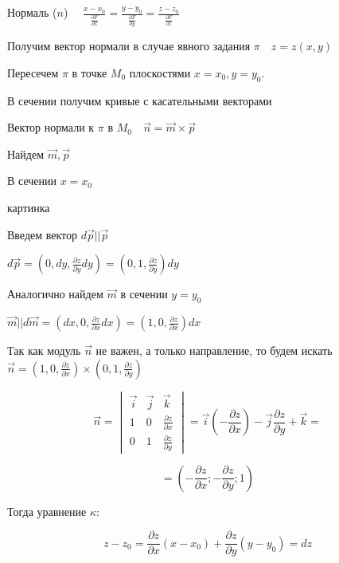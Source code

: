 \documentclass[12pt]{article}
\begin{document}
    Нормаль ($n$) $\quad \frac{x - x_0}{\frac{\partial F}{\partial x}} = \frac{y - y_0}{\frac{\partial F}{\partial y}} = \frac{z - z_0}{\frac{\partial F}{\partial z}}$

    \Nota Получим вектор нормали в случае явного задания $\pi \quad z = z(x, y)$

    Пересечем $\pi$ в точке $M_0$ плоскостями $x = x_0, y = y_0$.

    В сечении получим кривые с касательными векторами

    Вектор нормали к $\pi$ в $M_0 \quad \overrightarrow{n} = \overrightarrow{m} \times \overrightarrow{p}$

    Найдем $\overrightarrow{m}, \overrightarrow{p}$

    В сечении $x = x_0$

    картинка

    Введем вектор $d\overrightarrow{p} || \overrightarrow{p}$

    $d\overrightarrow{p} = \left(0, dy, \frac{\partial z}{\partial y}dy\right) = \left(0, 1, \frac{\partial z}{\partial y}\right) dy$

    Аналогично найдем $\overrightarrow{m}$ в сечении $y = y_0$

    $\overrightarrow{m} || d\overrightarrow{m} = \left(dx, 0, \frac{\partial z}{\partial x}dx\right) = \left(1, 0, \frac{\partial z}{\partial x}\right) dx$

    Так как модуль $\overrightarrow{n}$ не важен, а только направление, то будем искать
    $\overrightarrow{n} = \left(1, 0, \frac{\partial z}{\partial x}\right) \times \left(0, 1, \frac{\partial z}{\partial y}\right)$

    \[\overrightarrow{n} =
    \begin{vmatrix} \overrightarrow{i} & \overrightarrow{j} & \overrightarrow{k} \\
        1 & 0 & \frac{\partial z}{\partial x} \\ 0 & 1 & \frac{\partial z}{\partial y}
    \end{vmatrix} = \overrightarrow{i} \left(-\frac{\partial z}{\partial x}\right) - \overrightarrow{j} \frac{\partial z}{\partial y} + \overrightarrow{k} = \]

    \[= \left(-\frac{\partial z}{\partial x}; -\frac{\partial z}{\partial y}; 1\right)\]

    Тогда уравнение $\kappa$:

    \[z - z_0 = \frac{\partial z}{\partial x}(x - x_0) + \frac{\partial z}{\partial y} (y - y_0) = dz\]
\end{document}
